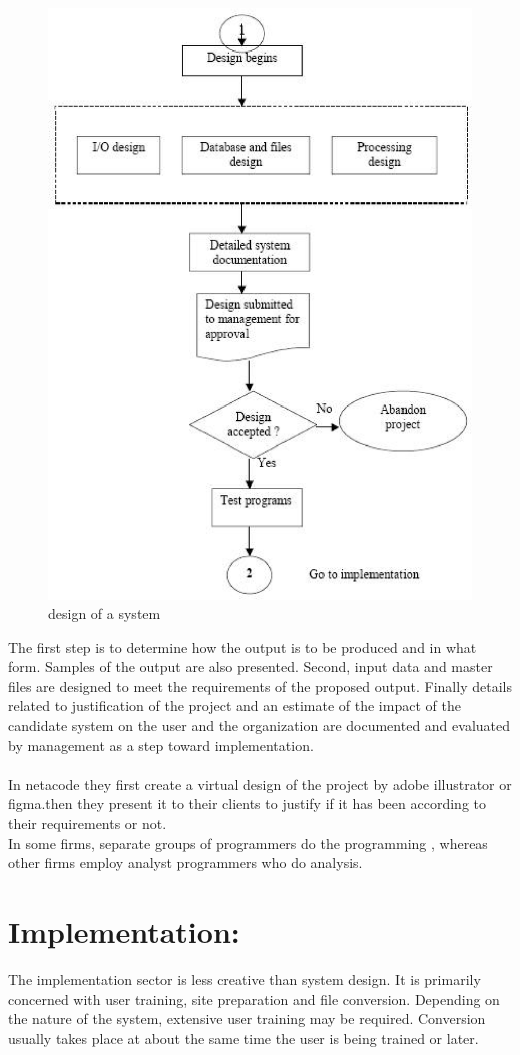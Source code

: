 \documentclass[a4paper,12pt]{report}
\begin{document}
\begin{figure}[h]
	\centering
	\includegraphics[width=0.7\linewidth]{fig-2;chap-2}
	\caption{design of a system}
	\label{fig:fig-2chap-2}
\end{figure}
The first step is to determine how the output is to be produced and in what form. Samples of the output are also presented. Second, input data and master files  are designed to meet the requirements of the proposed output. Finally details related to justification of the project and an estimate of the impact of the candidate system on the user and the organization  are documented and evaluated by management as a step toward implementation.
\\ \\
In netacode they first create a virtual design of the project by adobe illustrator or figma.then they present it to their clients to justify if it has been according to their requirements or not.\\
In some firms, separate groups of programmers do the programming , whereas other firms employ analyst programmers who do analysis.
\section{Implementation:}
The implementation sector is less creative than system design. It is primarily concerned with user training, site preparation and file conversion. Depending on the nature of the system, extensive user training may be required. Conversion usually takes place at about the same time the user is being trained or later.\\
\end{document}

